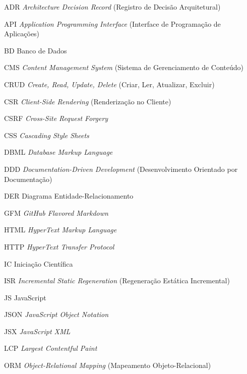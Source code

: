 
\begin{siglas}
	\item[ADR] \textit{Architecture Decision Record} (Registro de Decisão Arquitetural)
	\item[API] \textit{Application Programming Interface} (Interface de Programação de Aplicações)
	\item[BD] Banco de Dados
	\item[CMS] \textit{Content Management System} (Sistema de Gerenciamento de Conteúdo)
	\item[CRUD] \textit{Create, Read, Update, Delete} (Criar, Ler, Atualizar, Excluir)
	\item[CSR] \textit{Client-Side Rendering} (Renderização no Cliente)
	\item[CSRF] \textit{Cross-Site Request Forgery}
	\item[CSS] \textit{Cascading Style Sheets}
	\item[DBML] \textit{Database Markup Language}
	\item[DDD] \textit{Documentation-Driven Development} (Desenvolvimento Orientado por Documentação)
	\item[DER] Diagrama Entidade-Relacionamento
	\item[GFM] \textit{GitHub Flavored Markdown}
	\item[HTML] \textit{HyperText Markup Language}
	\item[HTTP] \textit{HyperText Transfer Protocol}
	\item[IC] Iniciação Científica
	\item[ISR] \textit{Incremental Static Regeneration} (Regeneração Estática Incremental)
	\item[JS] JavaScript
	\item[JSON] \textit{JavaScript Object Notation}
	\item[JSX] \textit{JavaScript XML}
	\item[LCP] \textit{Largest Contentful Paint}
	\item[ORM] \textit{Object-Relational Mapping} (Mapeamento Objeto-Relacional)

\end{siglas}
